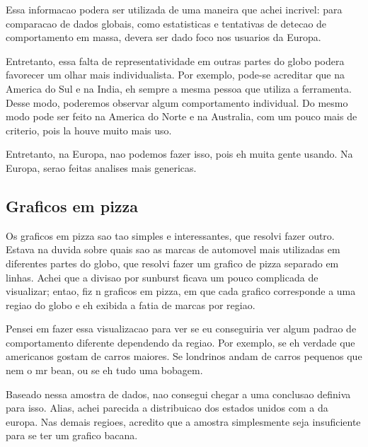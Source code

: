 \documentclass[10pt, conference]{IEEEtran}
\begin{document}
Essa informacao podera ser utilizada de uma maneira que achei incrivel: para comparacao de
dados globais, como estatisticas e tentativas de detecao de comportamento em massa, devera
ser dado foco nos usuarios da Europa.

Entretanto, essa falta de representatividade em outras partes do globo podera favorecer um
olhar mais individualista. Por exemplo, pode-se acreditar que na America do Sul e na India,
eh sempre a mesma pessoa que utiliza a ferramenta. Desse modo, poderemos observar algum
comportamento individual. Do mesmo modo pode ser feito na America do Norte e na Australia,
com um pouco mais de criterio, pois la houve muito mais uso.

Entretanto, na Europa, nao podemos fazer isso, pois eh muita gente usando. Na Europa, serao
feitas analises mais genericas.




\subsection{Graficos em pizza}

Os graficos em pizza sao tao simples e interessantes, que resolvi fazer outro. Estava na duvida sobre quais
sao as marcas de automovel mais utilizadas em diferentes partes do globo, que resolvi fazer um grafico de 
pizza separado em linhas. Achei que a divisao por sunburst ficava um pouco complicada de visualizar; entao, fiz n graficos
em pizza, em que cada grafico corresponde a uma regiao do globo e eh exibida a fatia de marcas por regiao.

Pensei em fazer essa visualizacao para ver se eu conseguiria ver algum padrao de comportamento diferente
dependendo da regiao. Por exemplo, se eh verdade que americanos gostam de carros maiores. Se londrinos andam de
carros pequenos que nem o mr bean, ou se eh tudo uma bobagem.

Baseado nessa amostra de dados, nao consegui chegar a uma conclusao definiva para isso. Alias, achei 
parecida a distribuicao dos estados unidos com a da europa. Nas demais regioes, acredito que a amostra
simplesmente seja insuficiente para se ter um grafico bacana.
\end{document}

